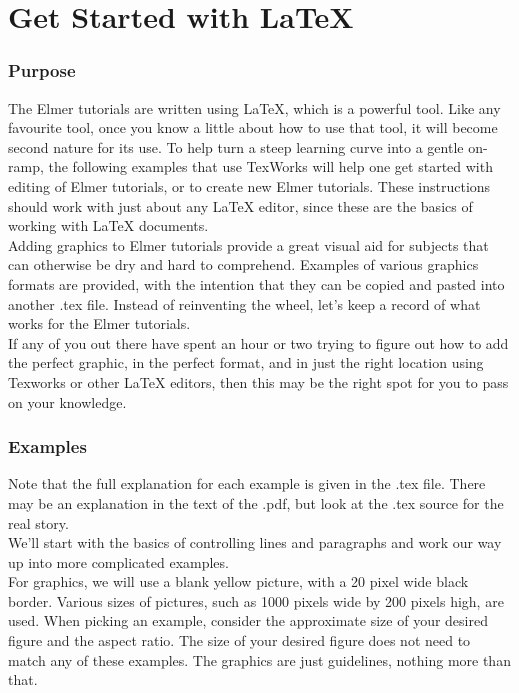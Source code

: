 \chapter{Get Started with LaTeX}



\subsection*{Purpose}

The Elmer tutorials are written using LaTeX, which is a powerful tool.  Like any favourite tool, once you know a little about how to use that tool, it will become second nature for its use.  To help turn a steep learning curve into a gentle on-ramp, the following examples that use TexWorks will help one get started with editing of Elmer tutorials, or to create new Elmer tutorials.  These instructions should work with just about any LaTeX editor, since these are the basics of working with LaTeX documents.\\

Adding graphics to Elmer tutorials provide a great visual aid for subjects that can otherwise be dry and hard to comprehend. Examples of various graphics formats are provided, with the intention that they can be copied and pasted into another .tex file.  Instead of reinventing the wheel, let's keep a record of what works for the Elmer tutorials.\\

If any of you out there have spent an hour or two trying to figure out how to add the perfect graphic, in the perfect format, and in just the right location using Texworks or other LaTeX editors, then this may be the right spot for you to pass on your knowledge.


\subsection*{Examples}

Note that the full explanation for each example is given in the .tex file. There may be an explanation in the text of the .pdf, but look at the .tex source for the real story.\\

We'll  start with the basics of controlling lines and paragraphs and work our way up into more complicated examples.\\


For graphics, we will use a blank yellow picture, with a 20 pixel wide black border.  Various sizes of pictures, such as 1000 pixels wide by 200 pixels high, are used.  When picking an example, consider the approximate size of your desired figure and the aspect ratio.  The size of your desired figure does not need to match any of these examples. The graphics are just guidelines, nothing more than that.\\

